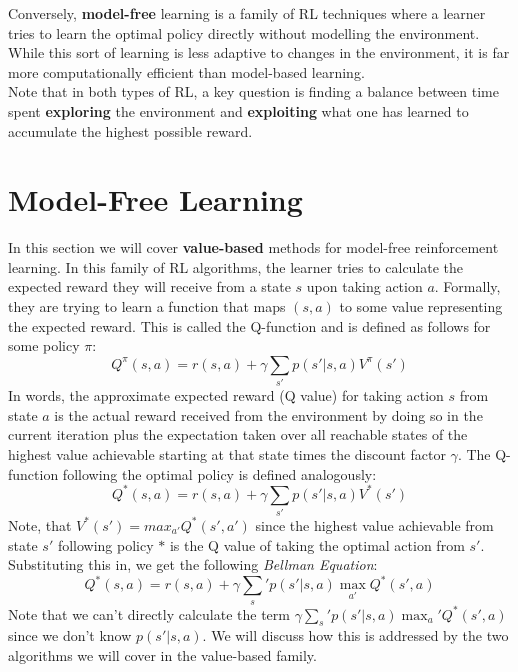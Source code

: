 Conversely, \textbf{model-free} learning is a family of RL techniques where a learner tries to learn the optimal policy directly without modelling the environment. While this sort of learning is less adaptive to changes in the environment, it is far more computationally efficient than model-based learning.\\

Note that in both types of RL, a key question is finding a balance between time spent \textbf{exploring} the environment and \textbf{exploiting} what one has learned to accumulate the highest possible reward. 
\section{Model-Free Learning}
In this section we will cover \textbf{value-based} methods for model-free reinforcement learning. In this family of RL algorithms, the learner tries to calculate the expected reward they will receive from a state $s$ upon taking action $a$. Formally, they are trying to learn a function that maps $(s, a)$ to some value representing the expected reward. This is called the Q-function and is defined as follows for some policy $\pi$:
\begin{equation}
    Q^{\pi}(s, a) = r(s, a) + \gamma\sum_{s'}p(s'|s, a)V^{\pi}(s')
\end{equation}
In words, the approximate expected reward (Q value) for taking action $s$ from state $a$ is the actual reward received from the environment by doing so in the current iteration plus the expectation taken over all reachable states of the highest value achievable starting at that state times the discount factor $\gamma$. The Q-function following the optimal policy is defined analogously:
\begin{equation}
    Q^{*}(s, a) = r(s, a) + \gamma\sum_{s'}p(s'|s, a)V^{*}(s')
\end{equation}
Note, that $V^*(s') = max_{a'}Q^*(s', a')$ since the highest value achievable from state $s'$ following policy $*$ is the Q value of taking the optimal action from $s'$. Substituting this in, we get the following \textit{Bellman Equation}:
\begin{equation}
    Q^*(s, a) = r(s, a) + \gamma\sum_s'p(s'|s, a)\max_{a'}Q^*(s', a)
\end{equation}
Note that we can't directly calculate the term $\gamma\sum_s'p(s'|s, a)\max_a'Q^*(s', a)$ since we don't know $p(s'|s, a)$. We will discuss how this is addressed by the two algorithms we will cover in the value-based family.
